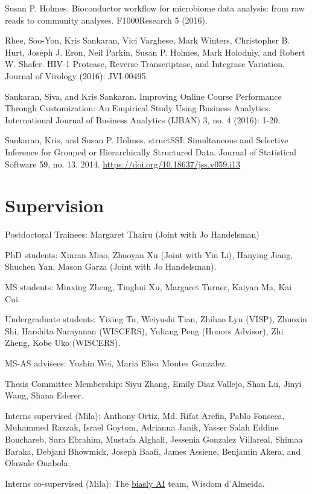 \documentclass[letterpaper]{article}
\renewenvironment{itemize}{
  \begin{list}{}{
    \setlength{\leftmargin}{1.5em}
  }
}{
  \end{list}
}
\begin{document}
\begin{itemize}
    Susan P. Holmes. Bioconductor workflow for microbiome data analysis: from
    raw reads to community analyses. F1000Research 5 (2016).
  \item Rhee, Soo-Yon, Kris Sankaran, Vici Varghese, Mark Winters, Christopher B.
    Hurt, Joseph J. Eron, Neil Parkin, Susan P. Holmes, Mark Holodniy, and Robert
    W. Shafer. HIV-1 Protease, Reverse Transcriptase, and Integrase Variation.
    Journal of Virology (2016): JVI-00495.
  \item Sankaran, Siva, and Kris Sankaran. Improving Online Course Performance
    Through Customization: An Empirical Study Using Business Analytics.
    International Journal of Business Analytics (IJBAN) 3, no. 4 (2016): 1-20.
\item Sankaran, Kris, and Susan P. Holmes. structSSI: Simultaneous and Selective
  Inference for Grouped or Hierarchically Structured Data. Journal of
  Statistical Software 59, no. 13. 2014. \href{https://doi.org/10.18637/jss.v059.i13}{https://doi.org/10.18637/jss.v059.i13}
\end{itemize}
\section*{Supervision}
\begin{itemize}
\item Postdoctoral Trainees: Margaret Thairu (Joint with Jo Handelsman)
\item PhD students: Xinran Miao, Zhuoyan Xu (Joint with Yin Li), Hanying Jiang,
Shuchen Yan, Mason Garza (Joint with Jo Handelsman).
\item MS students: Minxing Zheng, Tinghui Xu, Margaret Turner, Kaiyan Ma, Kai
Cui.
\item Undergraduate students: Yixing Tu, Weiyushi Tian, Zhihao Lyu (VISP),
  Zhuoxin Shi, Harshita Narayanan (WISCERS), Yuliang Peng (Honors Advisor), Zhi
  Zheng, Kobe Uko (WISCERS).
\item MS-AS advisees: Yushin Wei, Maria Elisa Montes Gonzalez.
\item Thesis Committee Membership: Siyu Zhang, Emily Diaz Vallejo, Shan Lu,
Jinyi Wang, Shana Ederer.
\item Interns supervised (Mila): Anthony Ortiz, Md. Rifat Arefin, Pablo Fonseca,
  Muhammed Razzak, Israel Goytom, Adrianna Janik, Yasser Salah Eddine Bouchareb,
  Sara Ebrahim, Mustafa Alghali, Jessenia Gonzalez Villareal, Shimaa Baraka,
  Debjani Bhowmick, Joseph Baafi, James Assiene, Benjamin Akera, and Olawale
  Onabola.
\item Interns co-supervised (Mila): The
\href{https://sites.google.com/view/biaslyai/home}{biasly AI} team, Wisdom
d'Almeida.
\end{itemize}
\end{document}
